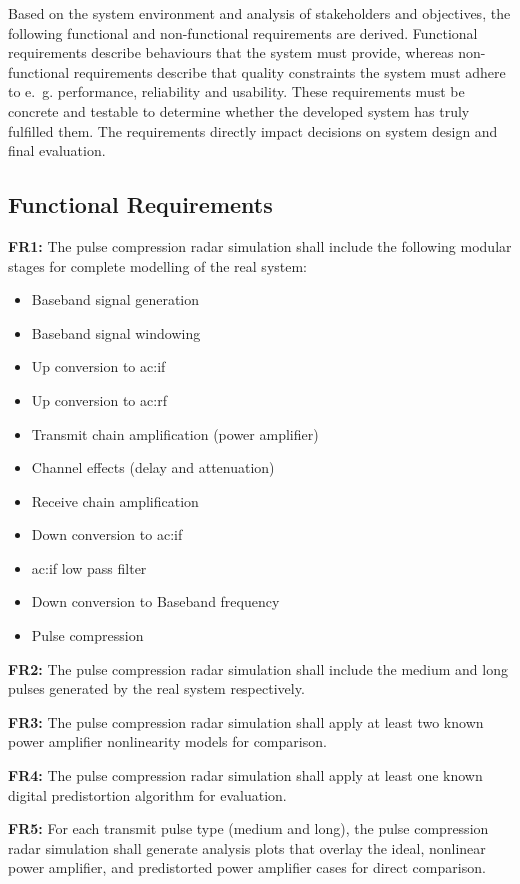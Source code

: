 Based on the system environment and analysis of stakeholders and objectives, the following functional and non-functional requirements are derived. Functional requirements describe behaviours that the system must provide, whereas non-functional requirements describe that quality constraints the system must adhere to e.~g. performance, reliability and usability. These requirements must be concrete and testable to determine whether the developed system has truly fulfilled them. The requirements directly impact decisions on system design and final evaluation.

\subsection{Functional Requirements}

\textbf{FR1:} The pulse compression radar simulation shall include the following modular stages for complete modelling of the real system: 
\begin{itemize}
    \item Baseband signal generation
    \item Baseband signal windowing
    \item Up conversion to \gls{ac:if}
    \item Up conversion to \gls{ac:rf}
    \item Transmit chain amplification (power amplifier)
    \item Channel effects (delay and attenuation)
    \item Receive chain amplification
    \item Down conversion to \gls{ac:if}
    \item \gls{ac:if} low pass filter 
    \item Down conversion to Baseband frequency
    \item Pulse compression
\end{itemize}
 
\textbf{FR2:} The pulse compression radar simulation shall include the medium and long pulses generated by the real system respectively.

\textbf{FR3:} The pulse compression radar simulation shall apply at least two known power amplifier nonlinearity models for comparison.

\textbf{FR4:} The pulse compression radar simulation shall apply at least one known digital predistortion algorithm for evaluation.

\textbf{FR5:} For each transmit pulse type (medium and long), the pulse compression radar simulation shall generate analysis plots that overlay the ideal, nonlinear power amplifier, and predistorted power amplifier cases for direct comparison.

